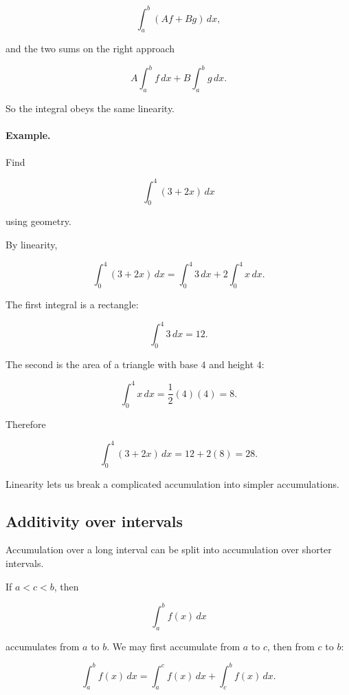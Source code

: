 \[
\int_a^b (Af+Bg)\,dx,
\]

and the two sums on the right approach

\[
A\int_a^b f\,dx
+
B\int_a^b g\,dx.
\]

So the integral obeys the same linearity.

\paragraph{Example.}
Find

\[
\int_0^4 (3+2x)\,dx
\]

using geometry.

By linearity,

\[
\int_0^4 (3+2x)\,dx
=
\int_0^4 3\,dx+2\int_0^4 x\,dx.
\]

The first integral is a rectangle:

\[
\int_0^4 3\,dx=12.
\]

The second is the area of a triangle with base \(4\) and height \(4\):

\[
\int_0^4 x\,dx=\frac12(4)(4)=8.
\]

Therefore

\[
\int_0^4 (3+2x)\,dx
=
12+2(8)
=
28.
\]

Linearity lets us break a complicated accumulation into simpler accumulations.

\subsection{Additivity over intervals}
\label{subsec:integral-additivity-intervals}

Accumulation over a long interval can be split into accumulation over shorter intervals.

If \(a<c<b\), then

\[
\int_a^b f(x)\,dx
\]

accumulates from \(a\) to \(b\).  We may first accumulate from \(a\) to \(c\), then from
\(c\) to \(b\):

\[
\boxed{
\int_a^b f(x)\,dx
=
\int_a^c f(x)\,dx
+
\int_c^b f(x)\,dx.
}
\]

